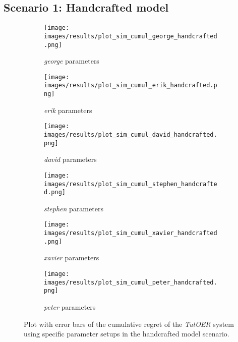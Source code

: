 \subsection{Scenario 1: Handcrafted model}
\begin{figure}[ht]
	\begin{subfigure}{0.48\linewidth}
	\centering
	\texttt{[image: images/results/plot\_sim\_cumul\_george\_handcrafted.png]}
	\caption{\emph{george} parameters}
	\label{fig:cumul_handcrafted_george}
	\end{subfigure}
	\hfill
	\begin{subfigure}{0.48\linewidth}
	\centering
	\texttt{[image: images/results/plot\_sim\_cumul\_erik\_handcrafted.png]}
	\caption{\emph{erik} parameters}
	\label{fig:cumul_handcrafted_erik}
	\end{subfigure}
	\begin{subfigure}{0.48\linewidth}
	\centering
	\texttt{[image: images/results/plot\_sim\_cumul\_david\_handcrafted.png]}
	\caption{\emph{david} parameters}
	\label{fig:cumul_handcrafted_david}
	\end{subfigure}
	\hfill
	\begin{subfigure}{0.48\linewidth}
	\centering
	\texttt{[image: images/results/plot\_sim\_cumul\_stephen\_handcrafted.png]}
	\caption{\emph{stephen} parameters}
	\label{fig:cumul_handcrafted_stephen}
	\end{subfigure}
	\begin{subfigure}{0.48\linewidth}
	\centering
	\texttt{[image: images/results/plot\_sim\_cumul\_xavier\_handcrafted.png]}
	\caption{\emph{xavier} parameters}
	\label{fig:cumul_handcrafted_xavier}
	\end{subfigure}
	\hfill
	\begin{subfigure}{0.48\linewidth}
	\centering
	\texttt{[image: images/results/plot\_sim\_cumul\_peter\_handcrafted.png]}
	\caption{\emph{peter} parameters}
	\label{fig:cumul_handcrafted_peter}
	\end{subfigure}
	\label{fig:cumul_handcrafted_individuals1}
	\caption{Plot with error bars of the cumulative regret of the \emph{TutOER}
	system using specific parameter setups in the handcrafted model
	scenario.}
\end{figure}


